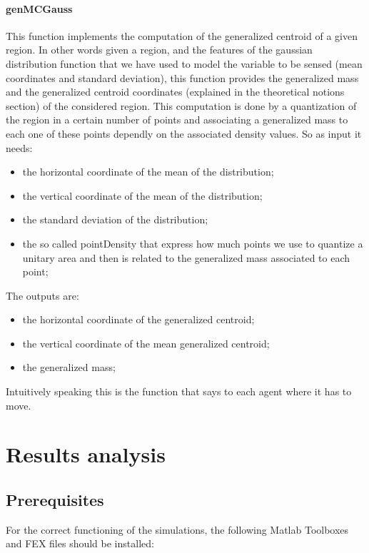 \documentclass[a4paper,11pt,oneside]{book}
\begin{document}
	
\subsubsection{genMCGauss}
	
	This function implements the computation of the generalized centroid of a given region. In other words given a region, and the features of the gaussian distribution function that we have used to model the variable to be sensed (mean coordinates and standard deviation), this function provides the generalized mass and the generalized centroid coordinates (explained in the theoretical notions section) of the considered region. This computation is done by a quantization of the region in a certain number of points and associating a generalized mass to each one of these points dependly on the associated density values. So as input it needs: 
	 \begin{itemize}
	\item the horizontal coordinate of the mean of the distribution;
	\item the vertical coordinate of the mean of the distribution;
	\item the standard deviation of the distribution;
	\item the so called pointDensity that express how much points we use to quantize a unitary area and then is related to the generalized mass associated to each point;
\end{itemize}
	The outputs are:
	 \begin{itemize}
	\item the horizontal coordinate of the generalized centroid;
	\item the vertical coordinate of the mean generalized centroid; 
	\item the generalized mass;
\end{itemize}
	Intuitively speaking this is the function that says to each agent where it has to move.
	
	\chapter{Results analysis}
	
	\section{Prerequisites}
	For the correct functioning of the simulations, the following Matlab Toolboxes and FEX files should be installed:
	
\end{document}
